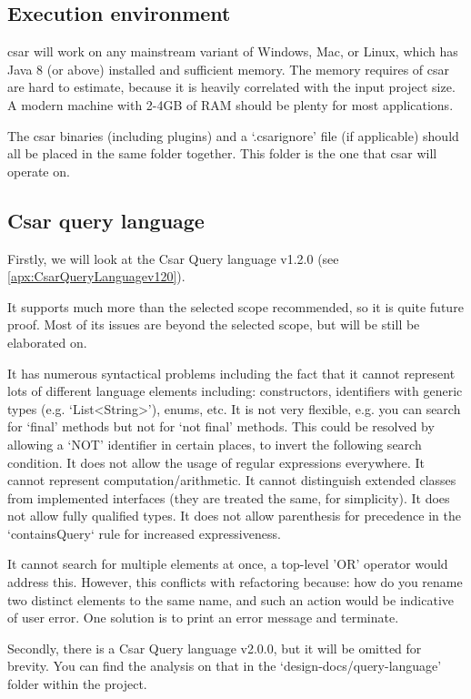 \documentclass[12pt, letterpaper]{article}
\begin{document}
\subsection{Execution environment}
csar will work on any mainstream variant of Windows, Mac, or Linux, which has Java 8 (or above) installed and sufficient memory.
The memory requires of csar are hard to estimate, because it is heavily correlated with the input project size.
A modern machine with 2-4GB of RAM should be plenty for most applications.

The csar binaries (including plugins) and a `.csarignore' file (if applicable) should all be placed in the same folder together.
This folder is the one that csar will operate on.

\subsection{Csar query language}
\label{sec:DesignCsarQuery}

Firstly, we will look at the Csar Query language v1.2.0 (see \ref{apx:CsarQueryLanguagev120}).

It supports much more than the selected scope recommended, so it is quite future proof.
Most of its issues are beyond the selected scope, but will be still be elaborated on.

It has numerous syntactical problems including the fact that it cannot represent lots of different language elements including: constructors, identifiers with generic types (e.g. `List<String>'), enums, etc.
It is not very flexible, e.g. you can search for `final' methods but not for `not final' methods.
This could be resolved by allowing a `NOT' identifier in certain places, to invert the following search condition.
It does not allow the usage of regular expressions everywhere.
It cannot represent computation/arithmetic.
It cannot distinguish extended classes from implemented interfaces (they are treated the same, for simplicity).
It does not allow fully qualified types.
It does not allow parenthesis for precedence in the `containsQuery` rule for increased expressiveness.

It cannot search for multiple elements at once, a top-level 'OR' operator would address this.  
However, this conflicts with refactoring because: how do you rename two distinct elements to the same name, and such an action would be indicative of user error. One solution is to print an error message and terminate.

Secondly, there is a Csar Query language v2.0.0, but it will be omitted for brevity.
You can find the analysis on that in the `design-docs/query-language' folder within the project.
\end{document}

